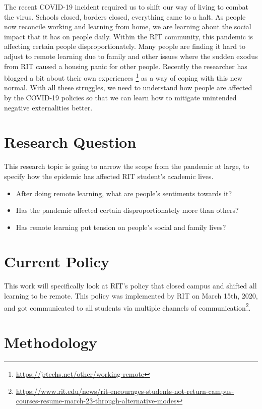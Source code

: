 \documentclass[12pt,
 reprint,
nofootinbib,
 amsmath,amssymb,
 aps,
floatfix,
]{revtex4-2}
\begin{document}
The recent COVID-19 incident required us to shift our way of living to combat the virus. Schools closed, borders closed, everything came to a halt\cite{covid}. As people now reconcile working and learning from home, we are learning about the social impact that it has on people daily. Within the RIT community, this pandemic is affecting certain people disproportionately. Many people are finding it hard to adjust to remote learning due to family and other issues where the sudden exodus from RIT caused a housing panic for other people. Recently the researcher has blogged a bit about their own experiences \footnote{\url{https://jrtechs.net/other/working-remote}} as a way of coping with this new normal. With all these struggles, we need to understand how people are affected by the COVID-19 policies so that we can learn how to mitigate unintended negative externalities better. 

\section{Research Question}

This research topic is going to narrow the scope from the pandemic at large, to specify how the epidemic has affected RIT student's academic lives.

\begin{itemize}
    \item After doing remote learning, what are people's sentiments towards it?
    \item Has the pandemic affected certain disproportionately more than others?
    \item Has remote learning put tension on people's social and family lives?
\end{itemize}

\section{Current Policy}

This work will specifically look at RIT's policy that closed campus and shifted all learning to be remote. This policy was implemented by RIT on March 15th, 2020, and got communicated to all students via multiple channels of communication\footnote{\url{https://www.rit.edu/news/rit-encourages-students-not-return-campus-courses-resume-march-23-through-alternative-modes}}.

\section{Methodology}
\end{document}
